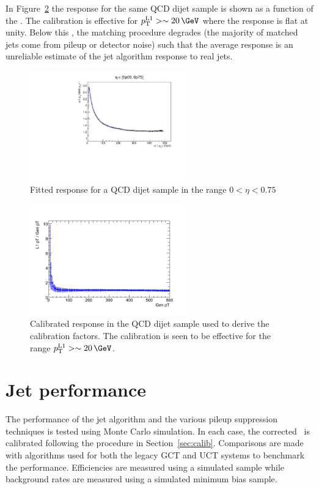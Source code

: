 In Figure~\ref{fig:closure_response} the response for the same QCD dijet sample is shown as a function of the \Lonept. The calibration
is effective for $\Lonept > \sim 20\,\GeV$ where the response is flat at unity. Below this \pt,
the matching procedure degrades (the majority of matched jets come from pileup or detector noise) 
such that the average response is an unreliable estimate of the jet algorithm response to real jets.

\begin{figure}
\centering
    \includegraphics[width=0.6\textwidth]{./Figures/triggerUpgrade/calibrationSeed5Chunky}
  \caption{
  Fitted response for a QCD dijet sample in the range $0 < \eta < 0.75$ }
  \label{fig:response}
\end{figure}

\begin{figure}
\centering
    \includegraphics[width=0.6\textwidth]{./Figures/triggerUpgrade/calib_s5_chunky}
  \caption{Calibrated response in the QCD dijet sample used to derive the calibration factors. The calibration is seen to be 
  effective for the range $\Lonept > \sim 20\,\GeV$.}
  \label{fig:closure_response}
\end{figure}

\section{Jet performance}
\label{sec:trig_perf}
The performance of the jet algorithm and the various pileup suppression techniques is tested using
Monte Carlo simulation. In each case, the corrected \Lonept~is calibrated following the procedure in Section~\ref{sec:calib}.
Comparisons are made with algorithms used for both the legacy GCT and UCT systems to benchmark the performance.
Efficiencies are measured using a simulated \ttbar sample while 
background rates are measured using a simulated minimum bias sample.

